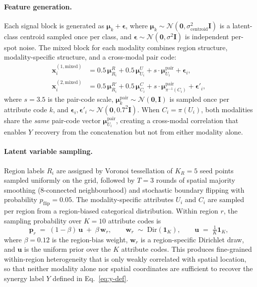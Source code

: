 \documentclass{article}
\theoremstyle{plain}
\theoremstyle{definition}
\begin{document}
\paragraph{Feature generation.}
Each signal block is generated as $\boldsymbol{\mu}_k + \boldsymbol{\epsilon}$, where $\boldsymbol{\mu}_k \sim \mathcal{N}(\mathbf{0}, \sigma^2_\text{centroid}\mathbf{I})$ is a latent-class centroid sampled once per class, and $\boldsymbol{\epsilon} \sim \mathcal{N}(\mathbf{0}, \sigma^2\mathbf{I})$ is independent per-spot noise. The mixed block for each modality combines region structure, modality-specific structure, and a cross-modal pair code:
\begin{align}
    \mathbf{x}^{(1,\text{mixed})}_i &= 0.5\,\boldsymbol{\mu}^{R}_{R_i} + 0.5\,\boldsymbol{\mu}^{U}_{U_i} + s \cdot \boldsymbol{\mu}^{\text{pair}}_{U_i} + \boldsymbol{\epsilon}_i, \label{eq:m1-mixed}\\
    \mathbf{x}^{(2,\text{mixed})}_i &= 0.5\,\boldsymbol{\mu}^{R'}_{R_i} + 0.5\,\boldsymbol{\mu}^{C}_{C_i} + s \cdot \boldsymbol{\mu}^{\text{pair}}_{\pi^{-1}(C_i)} + \boldsymbol{\epsilon}'_i, \label{eq:m2-mixed}
\end{align}
where $s = 3.5$ is the pair-code scale, $\boldsymbol{\mu}^{\text{pair}}_k \sim \mathcal{N}(\mathbf{0}, \mathbf{I})$ is sampled once per attribute code $k$, and $\boldsymbol{\epsilon}_i, \boldsymbol{\epsilon}'_i \sim \mathcal{N}(\mathbf{0}, 0.7^2 \mathbf{I})$. When $C_i = \pi(U_i)$, both modalities share the \emph{same} pair-code vector $\boldsymbol{\mu}^{\text{pair}}_{U_i}$, creating a cross-modal correlation that enables $Y$ recovery from the concatenation but not from either modality alone.

\paragraph{Latent variable sampling.}
Region labels $R_i$ are assigned by Voronoi tessellation of $K_R{=}5$ seed points sampled uniformly on the grid, followed by $T{=}3$ rounds of spatial majority smoothing (8-connected neighbourhood) and stochastic boundary flipping with probability $p_\text{flip}{=}0.05$. The modality-specific attributes $U_i$ and $C_i$ are sampled per region from a region-biased categorical distribution. Within region $r$, the sampling probability over $K{=}10$ attribute codes is
\begin{equation}\label{eq:region-bias}
    \mathbf{p}_r \;=\; (1 - \beta)\,\mathbf{u} \;+\; \beta\,\mathbf{w}_r,
    \qquad
    \mathbf{w}_r \;\sim\; \mathrm{Dir}(\mathbf{1}_K),
    \qquad
    \mathbf{u} \;=\; \tfrac{1}{K}\mathbf{1}_K,
\end{equation}
where $\beta = 0.12$ is the region-bias weight, $\mathbf{w}_r$ is a region-specific Dirichlet draw, and $\mathbf{u}$ is the uniform prior over the $K$ attribute codes. This produces fine-grained within-region heterogeneity that is only weakly correlated with spatial location, so that neither modality alone nor spatial coordinates are sufficient to recover the synergy label $Y$ defined in Eq.~\eqref{eq:y-def}.
\end{document}
